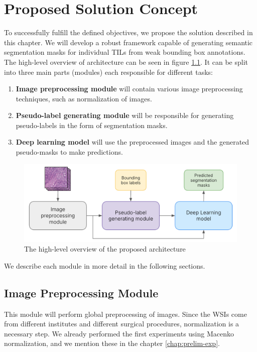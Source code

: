 \chapter{Proposed Solution Concept}
\label{chap:solution-concept}

To successfully fulfill the defined objectives, we propose the solution described in this chapter. We will develop a robust framework capable of generating semantic segmentation masks for individual TILs from weak bounding box annotations. The high-level overview of architecture can be seen in figure \ref{fig:sc-main}. It can be split into three main parts (modules) each responsible for different tasks:

\begin{enumerate}
    \item \textbf{Image preprocessing module} will contain various image preprocessing techniques, such as normalization of images.
    \item \textbf{Pseudo-label generating module} will be responsible for generating pseudo-labels in the form of segmentation masks.
    \item \textbf{Deep learning model} will use the preprocessed images and the generated pseudo-masks to make predictions.
\end{enumerate}

\begin{figure}[H]
    \begin{centering}
    \includegraphics[width=14cm]{assets/images/sc-main.png}
    \par\end{centering}
    \caption{The high-level overview of the proposed architecture}
    \label{fig:sc-main}
\end{figure}

We describe each module in more detail in the following sections.

\section{Image Preprocessing Module}
This module will perform global preprocessing of images. Since the WSIs come from different institutes and different surgical procedures, normalization is a necessary step. We already performed the first experiments using Macenko normalization, and we mention these in the chapter \ref{chap:prelim-exp}.

